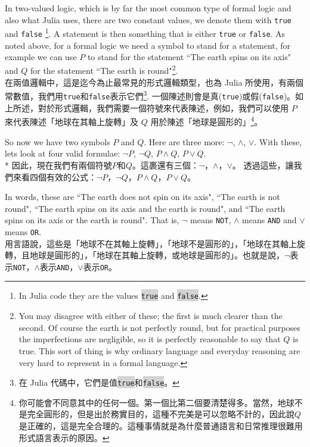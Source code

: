 \documentclass[]{article}
\newcommand{\codequote}[1]{\colorbox{lightgray}{\tt #1}}
\begin{document}
{\color{gray}In two-valued logic, which is by far the most common type of formal logic and also what Julia uses, there are two constant values, we denote them with {\tt true} and {\tt false} \footnote{{\color{gray}In Julia code they are the values \codequote{true} and \codequote{false}.}}. A statement is then something that is either {\tt true} or {\tt false}. As noted above, for a formal logic we need a symbol to stand for a statement, for example we can use $P$ to stand for the statement ``The earth spins on its axis" and $Q$ for the statement ``The earth is round"\footnote{{\color{gray}You may disagree with either of these; the first is much clearer than the second. Of course the earth is not perfectly round, but for practical purposes the imperfections are negligible, so it is perfectly reasonable to say that $ Q $ is true. This sort of thing is why ordinary language and everyday reasoning are very hard to represent in a formal language.}}.}
\\
{在兩值邏輯中，這是迄今為止最常見的形式邏輯類型，也為 Julia 所使用，有兩個常數值，我們用{\tt true}和{\tt false}表示它們\footnote{在 Julia 代碼中，它們是值\codequote{true}和\codequote{false}。}. 一個陳述則會是真({\tt true})或假({\tt false})。如上所述，對於形式邏輯，我們需要一個符號來代表陳述，例如，我們可以使用 $P$ 來代表陳述「地球在其軸上旋轉」及 $Q$ 用於陳述「地球是圓形的」\footnote{你可能會不同意其中的任何一個。第一個比第二個要清楚得多。當然，地球不是完全圓形的，但是出於務實目的，這種不完美是可以忽略不計的，因此說$ Q $是正確的，這是完全合理的。這種事情就是為什麼普通語言和日常推理很難用形式語言表示的原因。}。}

{\color{gray}So now we have two symbols $ P $ and $ Q $. Here are three more: $ \neg $, $ \land $, $ \lor $. With these, lets look at four valid formulae: $ \lnot P $, $ \lnot Q $, $ P \land Q $, $ P \lor Q$.}
\\*
{因此，現在我們有兩個符號$ P $和$ Q $。這裹還有三個：$ \neg $，$ \land $，$ \lor $。 透過這些，讓我們來看四個有效的公式：$ \lnot P $，$ \lnot Q $，$ P \land Q $，$ P \lor Q $。}

{\color{gray}In words, these are ``The earth does not spin on its axis", ``The earth is not round", ``The earth spins on its axis and the earth is round", and ``The earth spins on its axis or the earth is round". That is, $ \neg $ means {\tt NOT}, $ \land $ means {\tt AND} and $ \lor $ means {\tt OR}.}
\\
{用言語說，這些是「地球不在其軸上旋轉」，「地球不是圓形的」，「地球在其軸上旋轉，且地球是圓形的」，「地球在其軸上旋轉，或地球是圓形的」。也就是說，$ \neg $表示{\tt NOT}，$ \land $表示{\tt AND}，$ \lor $表示{\tt OR}。}
\end{document}
